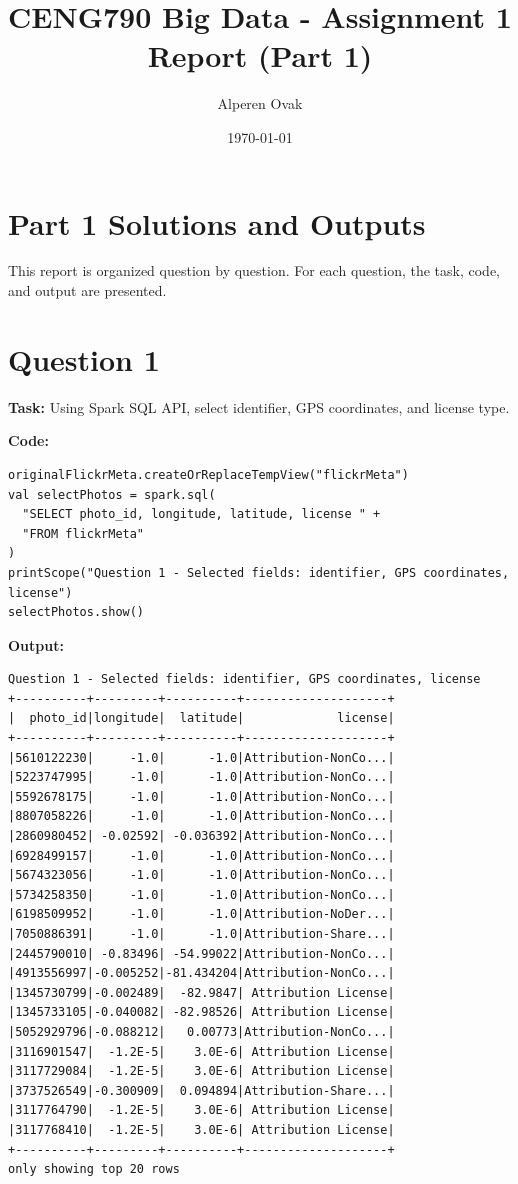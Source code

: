 \documentclass[11pt]{article}
\title{CENG790 Big Data - Assignment 1 Report (Part 1)}
\author{Alperen Ovak}
\date{\today}
\begin{document}
\maketitle

\section*{Part 1 Solutions and Outputs}
This report is organized question by question. For each question, the task, code, and output are presented.

\section*{Question 1}
\textbf{Task:} Using Spark SQL API, select identifier, GPS coordinates, and license type.

\textbf{Code:}
\begin{lstlisting}
originalFlickrMeta.createOrReplaceTempView("flickrMeta")
val selectPhotos = spark.sql(
  "SELECT photo_id, longitude, latitude, license " +
  "FROM flickrMeta"
)
printScope("Question 1 - Selected fields: identifier, GPS coordinates, license")
selectPhotos.show()
\end{lstlisting}

\textbf{Output:}
\begin{lstlisting}
Question 1 - Selected fields: identifier, GPS coordinates, license
+----------+---------+----------+--------------------+
|  photo_id|longitude|  latitude|             license|
+----------+---------+----------+--------------------+
|5610122230|     -1.0|      -1.0|Attribution-NonCo...|
|5223747995|     -1.0|      -1.0|Attribution-NonCo...|
|5592678175|     -1.0|      -1.0|Attribution-NonCo...|
|8807058226|     -1.0|      -1.0|Attribution-NonCo...|
|2860980452| -0.02592| -0.036392|Attribution-NonCo...|
|6928499157|     -1.0|      -1.0|Attribution-NonCo...|
|5674323056|     -1.0|      -1.0|Attribution-NonCo...|
|5734258350|     -1.0|      -1.0|Attribution-NonCo...|
|6198509952|     -1.0|      -1.0|Attribution-NoDer...|
|7050886391|     -1.0|      -1.0|Attribution-Share...|
|2445790010| -0.83496| -54.99022|Attribution-NonCo...|
|4913556997|-0.005252|-81.434204|Attribution-NonCo...|
|1345730799|-0.002489|  -82.9847| Attribution License|
|1345733105|-0.040082| -82.98526| Attribution License|
|5052929796|-0.088212|   0.00773|Attribution-NonCo...|
|3116901547|  -1.2E-5|    3.0E-6| Attribution License|
|3117729084|  -1.2E-5|    3.0E-6| Attribution License|
|3737526549|-0.300909|  0.094894|Attribution-Share...|
|3117764790|  -1.2E-5|    3.0E-6| Attribution License|
|3117768410|  -1.2E-5|    3.0E-6| Attribution License|
+----------+---------+----------+--------------------+
only showing top 20 rows
\end{lstlisting}
\end{document}
